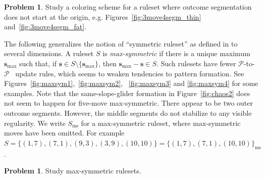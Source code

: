 \documentclass{amsart}
\theoremstyle{plain}
\theoremstyle{definition}
\newtheorem{problem}[thm]{Problem}
\renewcommand{\P}{\ensuremath{\mathcal P}}
\newcommand{\s}{\boldsymbol s}
\begin{document}
\begin{problem}
    Study a coloring scheme for a ruleset where outcome segmentation does not start at the origin, e.g. Figures~\ref{fig:3move4segm_thin} and~\ref{fig:3move4segm_fat}.
\end{problem}

The following generalizes the notion of ``symmetric ruleset'' as defined in \cite{Flammenkamp_1997} to several dimensions. A ruleset $S$ is {\em max-symmetric} if there is a unique maximum $\s_{\max}$ such that, if $\s\in S\setminus\{\s_{\max}\}$, then $\s_{\max}-\s\in S$. Such rulesets have fewer \P-to-\P~ update rules, which seems to weaken tendencies to pattern formation.
See Figures~\ref{fig:maxsym1},~\ref{fig:maxsym2},~ \ref{fig:maxsym3} and \ref{fig:maxsym4} for some examples. Note that the same-slope-glider formation in Figure~\ref{fig:chaos2} does not seem to happen for {\sc five-move max-symmetric}. There appear to be two outer outcome segments. However, the middle segments do not stabilize to any visible regularity. 
We write $S_{\mathrm{ms}}$ for a max-symmetric ruleset, where max-symmetric moves have been omitted. For example $S=\{(1,7),(7,1),(9,3),(3,9),(10,10)\}=\{(1,7),(7,1),(10,10)\}_{\mathrm{ms}}$.
\begin{problem}
    Study max-symmetric rulesets.
\end{problem}
\end{document}
